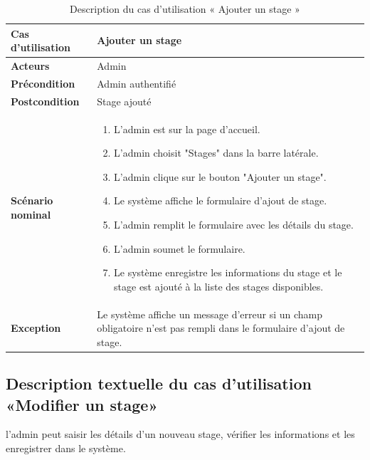 \begin{sloppypar}
\begin{table}[h]
\centering
\begin{tabular}{|p{3cm}|p{12cm}|}
\hline
\textbf{Cas d'utilisation } & Ajouter un stage \\
\hline
\textbf{Acteurs} & Admin \\
\hline
\textbf{Précondition} & Admin authentifié \\
\hline
\textbf{Postcondition} & Stage ajouté \\
\hline
\textbf{Scénario nominal} &
\begin{enumerate}
    \item L'admin est sur la page d'accueil.
    \item L'admin choisit "Stages" dans la barre latérale.
    \item L'admin clique sur le bouton "Ajouter un stage".
    \item Le système affiche le formulaire d'ajout de stage.
    \item L'admin remplit le formulaire avec les détails du stage.
    \item L'admin soumet le formulaire.
    \item Le système enregistre les informations du stage et le stage est ajouté à la liste des stages disponibles.
\end{enumerate} \\
\hline
\textbf{Exception} & Le système affiche un message d'erreur si un champ obligatoire n'est pas rempli dans le formulaire d'ajout de stage. \\
\hline 
\end{tabular}
\caption{Description du cas d’utilisation « Ajouter un stage »}
\end{table}

\vspace{-1.3cm}

\subsection{Description textuelle du cas d’utilisation «Modifier un stage»}
\vspace{-4mm}
l'admin peut saisir les détails d'un nouveau stage, vérifier les informations et les enregistrer dans le système.


\end{sloppypar}
